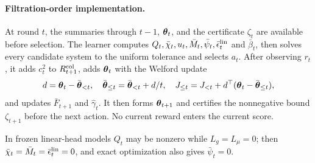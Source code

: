 \documentclass[twoside]{article}
\begin{document}
\paragraph{Filtration-order implementation.}
At round $t$, the summaries through $t-1$, $\boldsymbol{\theta}_t$, and the certificate
$\zeta_t$ are available before selection.  The learner computes
$Q_t,\bar\chi_t,u_t,\bar M_t,\bar\psi_t,\bar\epsilon_t^{\rm lin}$ and
$\bar\beta_t$, then solves every candidate system to the uniform tolerance
and selects $a_t$.  After observing $r_t$, it adds $c_t^2$ to
$R_{t+1}^{\rm col}$, adds $\boldsymbol{\theta}_t$ with the Welford update
\[
 d=\boldsymbol{\theta}_t-\bar{\boldsymbol{\theta}}_{<t},\quad
 \bar{\boldsymbol{\theta}}_{\le t}=\bar{\boldsymbol{\theta}}_{<t}+d/t,\quad
 J_{\le t}=J_{<t}+d^\top(\boldsymbol{\theta}_t-\bar{\boldsymbol{\theta}}_{\le t}),
\]
and updates $\bar F_{t+1}$ and $\hat\gamma_t$.  It then forms
$\boldsymbol{\theta}_{t+1}$ and certifies the nonnegative bound $\zeta_{t+1}$ before
the next action.  No current reward enters the current score.

In frozen linear-head models $Q_t$ may be nonzero while $L_g=L_\mu=0$;
then $\bar\chi_t=\bar M_t=\bar\epsilon_t^{\rm lin}=0$, and exact
optimization also gives $\bar\psi_t=0$.
\end{document}
